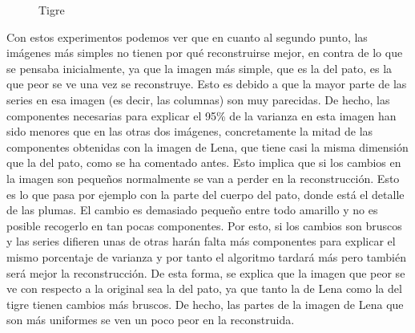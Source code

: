 \begin{figure}
 \centering
 \caption{Tigre}
 \label{f:imgsTigre}
\end{figure}


Con estos experimentos podemos ver que en cuanto al segundo punto, las imágenes más simples no tienen por qué reconstruirse mejor, en contra de lo que se pensaba inicialmente, ya que la imagen más simple, que es la del pato, es la que peor se ve una vez se reconstruye. Esto es debido a que la mayor parte de las series en esa imagen (es decir, las columnas) son muy parecidas. De hecho, las componentes necesarias para explicar el 95\% de la varianza en esta imagen han sido menores que en las otras dos imágenes, concretamente la mitad de las componentes obtenidas con la imagen de Lena, que tiene casi la misma dimensión que la del pato, como se ha comentado antes. Esto implica que si los cambios en la imagen son pequeños normalmente se van a perder en la reconstrucción. Esto es lo que pasa por ejemplo con la parte del cuerpo del pato, donde está el detalle de las plumas. El cambio es demasiado pequeño entre todo amarillo y no es posible recogerlo en tan pocas componentes. Por esto, si los cambios son bruscos y las series difieren unas de otras harán falta más componentes para explicar el mismo porcentaje de varianza y por tanto el algoritmo tardará más pero también será mejor la reconstrucción. De esta forma, se explica que la imagen que peor se ve con respecto a la original sea la del pato, ya que tanto la de Lena como la del tigre tienen cambios más bruscos. De hecho, las partes de la imagen de Lena que son más uniformes se ven un poco peor en la reconstruida.\\

